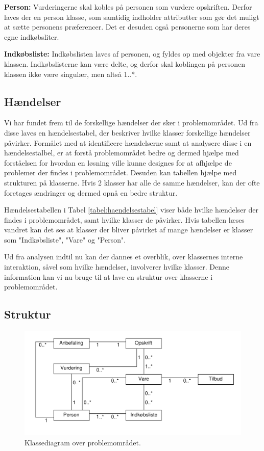 \textbf{Person:}
Vurderingerne skal kobles på personen som vurdere opskriften. 
Derfor laves der en person klasse, som samtidig indholder attributter som gør det muligt at sætte personens præferencer.
Det er desuden også personerne som har deres egne indkøbsliter.

\textbf{Indkøbsliste:}
Indkøbslisten laves af personen, og fyldes op med objekter fra vare klassen.
Indkøbslisterne kan være delte, og derfor skal koblingen på personen klassen ikke være singulær, men altså 1..*.


\subsection{Hændelser}
Vi har fundet frem til de forskellige hændelser der sker i problemområdet.
Ud fra disse laves en hændelsestabel, der beskriver hvilke klasser forskellige hændelser påvirker.
Formålet med at identificere hændelserne samt at analysere disse i en hændelsestalbel, er at forstå problemområdet bedre og dermed hjælpe med forståelsen for hvordan en løsning ville kunne designes for at afhjælpe de problemer der findes i problemområdet. Desuden kan tabellen hjælpe med strukturen på klasserne.
Hvis 2 klasser har alle de samme hændelser, kan der ofte foretages ændringer og dermed opnå en bedre struktur.



Hændelsestabellen i Tabel \ref{tabel:haendelsestabel} viser både hvilke hændelser der findes i problemområdet, samt hvilke klasser de påvirker.
Hvis tabellen læses vandret kan det ses at klasser der bliver påvirket af mange hændelser er klasser som "Indkøbsliste", "Vare" og "Person".

Ud fra analysen indtil nu kan der dannes et overblik, over klassernes interne interaktion, såvel som hvilke hændelser, involverer hvilke klasser.
Denne information kan vi nu bruge til at lave en struktur over klasserne i problemområdet.


\subsection{Struktur}\label{sec:struktur}

\begin{figure}
	\centering
		\includegraphics[scale=0.6]{images/Diagrams/klassediagram_model_simple.pdf}
	\caption{Klassediagram over problemområdet.}
	\label{figur:PDklasse}
\end{figure}

